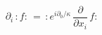 \begin{equation}\label{38}
  \partial_i\, :f:\,= \,: e^{i\partial_0/\kappa}\,
\frac{\partial}{\partial x_i}\, f:
\end{equation}


